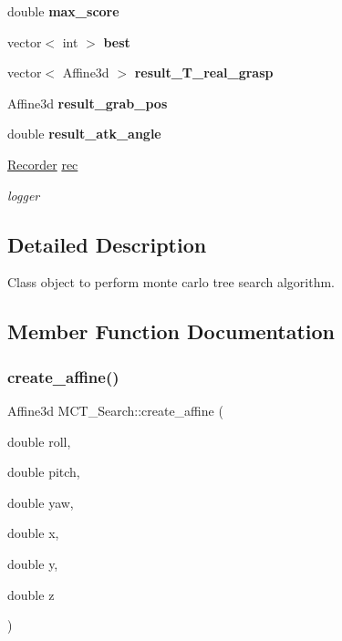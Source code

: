 \begin{DoxyCompactItemize}
double {\bfseries max\+\_\+score}
\item 
\mbox{\label{classMCT__Search_aa06c7cb38da1cf4a4ba1a43557b6cafb}} 
vector$<$ int $>$ {\bfseries best}
\item 
\mbox{\label{classMCT__Search_a0d485804bacaf6f8cc76be65eb498199}} 
vector$<$ Affine3d $>$ {\bfseries result\+\_\+\+T\+\_\+real\+\_\+grasp}
\item 
\mbox{\label{classMCT__Search_a1afd6756c56b7025fea3a6b4a3a7657b}} 
Affine3d {\bfseries result\+\_\+grab\+\_\+pos}
\item 
\mbox{\label{classMCT__Search_a19574b3a6f9f587ebafb0fec2f058641}} 
double {\bfseries result\+\_\+atk\+\_\+angle}
\item 
\mbox{\label{classMCT__Search_afcc8fdcae097f75b6cd6b3ee3b3e61cf}} 
\hyperlink{classRecorder}{Recorder} \hyperlink{classMCT__Search_afcc8fdcae097f75b6cd6b3ee3b3e61cf}{rec}
\begin{DoxyCompactList}\small\item\em logger \end{DoxyCompactList}\end{DoxyCompactItemize}


\subsection{Detailed Description}
Class object to perform monte carlo tree search algorithm. 

\subsection{Member Function Documentation}
\mbox{\label{classMCT__Search_a257afef600f88f324a253be66209823c}} 
\subsubsection{\texorpdfstring{create\+\_\+affine()}{create\_affine()}}
{\footnotesize\ttfamily Affine3d M\+C\+T\+\_\+\+Search\+::create\+\_\+affine (\begin{DoxyParamCaption}\item[{double}]{roll,  }\item[{double}]{pitch,  }\item[{double}]{yaw,  }\item[{double}]{x,  }\item[{double}]{y,  }\item[{double}]{z }\end{DoxyParamCaption})\hspace{0.3cm}{\ttfamily [private]}}




